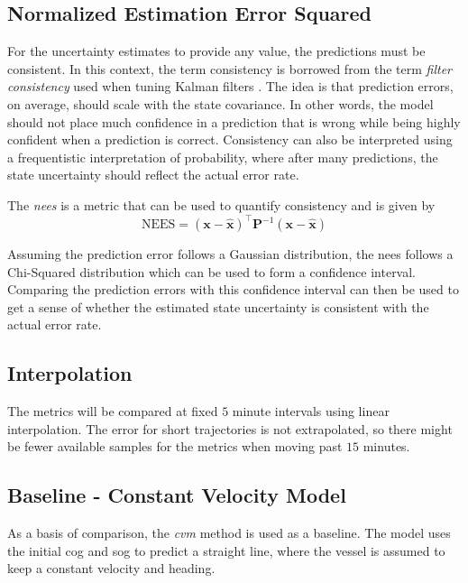 \subsection{Normalized Estimation Error Squared}
For the uncertainty estimates to provide any value, the predictions must be consistent. In this context, the term consistency is borrowed from the term \textit{filter consistency} used when tuning Kalman filters \cite{sensorfusjon}. The idea is that prediction errors, on average, should scale with the state covariance. In other words, the model should not place much confidence in a prediction that is wrong while being highly confident when a prediction is correct. Consistency can also be interpreted using a frequentistic interpretation of probability, where after many predictions, the state uncertainty should reflect the actual error rate.

The \textit{\acrfull{nees}} is a metric that can be used to quantify consistency and is given by
\begin{equation}
    \text{NEES} = (\boldsymbol{x} - \hat{\boldsymbol{x}})^\intercal \boldsymbol{P}^{-1} (\boldsymbol{x} - \hat{\boldsymbol{x}})
\end{equation}

Assuming the prediction error follows a Gaussian distribution, the \acrshort{nees} follows a Chi-Squared distribution which can be used to form a confidence interval. Comparing the prediction errors with this confidence interval can then be used to get a sense of whether the estimated state uncertainty is consistent with the actual error rate.

\subsection{Interpolation}
The metrics will be compared at fixed $5$ minute intervals using linear interpolation. The error for short trajectories is not extrapolated, so there might be fewer available samples for the metrics when moving past $15$ minutes.

\subsection{Baseline - Constant Velocity Model}
As a basis of comparison, the \textit{\acrfull{cvm}} method is used as a baseline. The model uses the initial \acrshort{cog} and \acrshort{sog} to predict a straight line, where the vessel is assumed to keep a constant velocity and heading.

